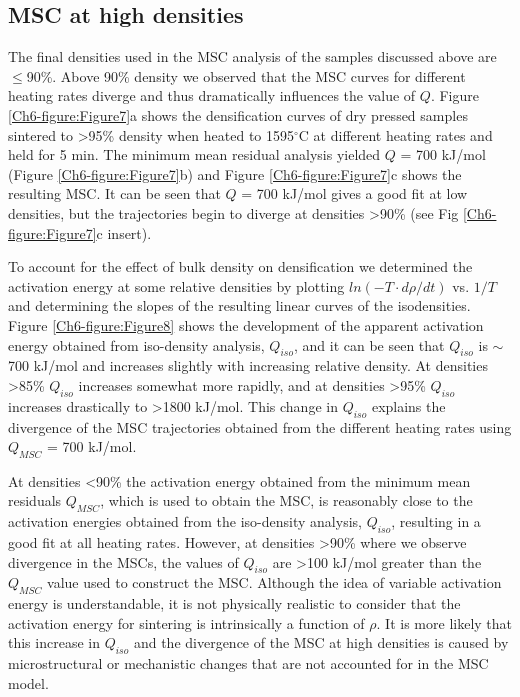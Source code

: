 \subsection{MSC at high densities}
The final densities used in the MSC analysis of the samples discussed above are $\leq$90\%. Above 90\% density we observed that the MSC curves for different heating rates diverge and thus dramatically influences the value of $Q$. Figure \ref{Ch6-figure:Figure7}a shows the densification curves of dry pressed samples sintered to >95\% density when heated to 1595$^{\circ}$C at different heating rates and held for 5 min. The minimum mean residual analysis yielded $Q$ = 700 kJ/mol (Figure \ref{Ch6-figure:Figure7}b) and Figure \ref{Ch6-figure:Figure7}c shows the resulting MSC. It can be seen that $Q$ = 700 kJ/mol gives a good fit at low densities, but the trajectories begin to diverge at densities >90\% (see Fig \ref{Ch6-figure:Figure7}c insert). 

To account for the effect of bulk density on densification we determined the activation energy at some relative densities by plotting $ln(-T·d\rho/dt)$ vs. $1/T$ and determining the slopes of the resulting linear curves of the isodensities. Figure \ref{Ch6-figure:Figure8} shows the development of the apparent activation energy obtained from iso-density analysis, $Q_{iso}$, and it can be seen that $Q_{iso}$ is $\sim$700 kJ/mol and increases slightly with increasing relative density. At densities >85\% $Q_{iso}$ increases somewhat more rapidly, and at densities >95\% $Q_{iso}$ increases drastically to >1800 kJ/mol. This change in $Q_{iso}$ explains the divergence of the MSC trajectories obtained from the different heating rates using $Q_{MSC}$ = 700 kJ/mol. 

At densities <90\% the activation energy obtained from the minimum mean residuals $Q_{MSC}$, which is used to obtain the MSC, is reasonably close to the activation energies obtained from the iso-density analysis, $Q_{iso}$, resulting in a good fit at all heating rates. However, at densities >90\% where we observe divergence in the MSCs, the values of $Q_{iso}$ are >100 kJ/mol greater than the $Q_{MSC}$ value used to construct the MSC. Although the idea of variable activation energy is understandable, it is not physically realistic to consider that the activation energy for sintering is intrinsically a function of $\rho$. It is more likely that this increase in $Q_{iso}$ and the divergence of the MSC at high densities is caused by microstructural or mechanistic changes that are not accounted for in the MSC model. 

